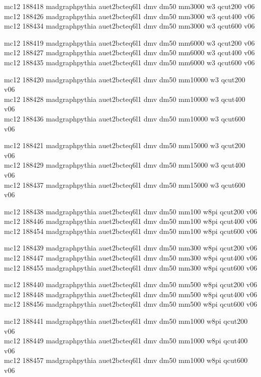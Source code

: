 mc12 188418 madgraphpythia auet2bcteq6l1 dmv dm50 mm3000 w3 qcut200 v06\\
mc12 188426 madgraphpythia auet2bcteq6l1 dmv dm50 mm3000 w3 qcut400 v06\\
mc12 188434 madgraphpythia auet2bcteq6l1 dmv dm50 mm3000 w3 qcut600 v06

mc12 188419 madgraphpythia auet2bcteq6l1 dmv dm50 mm6000 w3 qcut200 v06\\
mc12 188427 madgraphpythia auet2bcteq6l1 dmv dm50 mm6000 w3 qcut400 v06\\
mc12 188435 madgraphpythia auet2bcteq6l1 dmv dm50 mm6000 w3 qcut600 v06

mc12 188420 madgraphpythia auet2bcteq6l1 dmv dm50 mm10000 w3 qcut200 v06\\
mc12 188428 madgraphpythia auet2bcteq6l1 dmv dm50 mm10000 w3 qcut400 v06\\
mc12 188436 madgraphpythia auet2bcteq6l1 dmv dm50 mm10000 w3 qcut600 v06

mc12 188421 madgraphpythia auet2bcteq6l1 dmv dm50 mm15000 w3 qcut200 v06\\
mc12 188429 madgraphpythia auet2bcteq6l1 dmv dm50 mm15000 w3 qcut400 v06\\
mc12 188437 madgraphpythia auet2bcteq6l1 dmv dm50 mm15000 w3 qcut600 v06

mc12 188438 madgraphpythia auet2bcteq6l1 dmv dm50 mm100 w8pi qcut200 v06\\
mc12 188446 madgraphpythia auet2bcteq6l1 dmv dm50 mm100 w8pi qcut400 v06\\
mc12 188454 madgraphpythia auet2bcteq6l1 dmv dm50 mm100 w8pi qcut600 v06

mc12 188439 madgraphpythia auet2bcteq6l1 dmv dm50 mm300 w8pi qcut200 v06\\
mc12 188447 madgraphpythia auet2bcteq6l1 dmv dm50 mm300 w8pi qcut400 v06\\
mc12 188455 madgraphpythia auet2bcteq6l1 dmv dm50 mm300 w8pi qcut600 v06

mc12 188440 madgraphpythia auet2bcteq6l1 dmv dm50 mm500 w8pi qcut200 v06\\
mc12 188448 madgraphpythia auet2bcteq6l1 dmv dm50 mm500 w8pi qcut400 v06\\
mc12 188456 madgraphpythia auet2bcteq6l1 dmv dm50 mm500 w8pi qcut600 v06

mc12 188441 madgraphpythia auet2bcteq6l1 dmv dm50 mm1000 w8pi qcut200 v06\\
mc12 188449 madgraphpythia auet2bcteq6l1 dmv dm50 mm1000 w8pi qcut400 v06\\
mc12 188457 madgraphpythia auet2bcteq6l1 dmv dm50 mm1000 w8pi qcut600 v06

